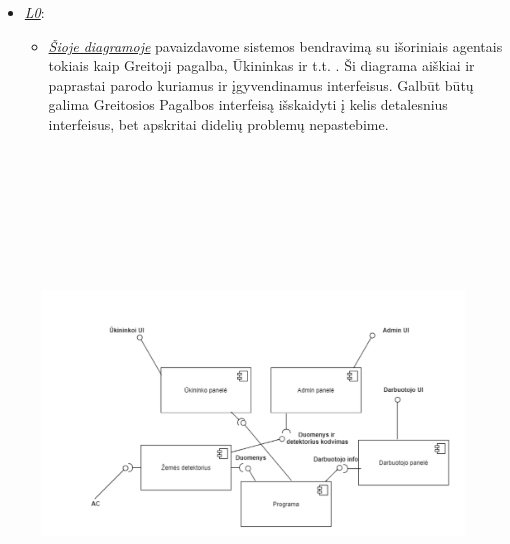 \documentclass[oneside]{VUMIFPSkursinis}
\begin{document}
	\begin{itemize}
		
		\item \hyperref[fig:l0]{\textit{L0}}:
		\begin{itemize}
			\item  \hyperref[fig:l0]{\textit{Šioje diagramoje}} pavaizdavome sistemos bendravimą su išoriniais agentais tokiais kaip Greitoji pagalba, Ūkininkas ir t.t. . Ši diagrama aiškiai ir paprastai parodo kuriamus ir įgyvendinamus interfeisus. Galbūt būtų galima Greitosios Pagalbos interfeisą išskaidyti į kelis detalesnius interfeisus, bet apskritai didelių problemų nepastebime.

		\end{itemize}

	\end{itemize}
\begin{figure}[H]	
\centering	
\includegraphics[width=14cm,height=14cm,keepaspectratio]{l1.png}	
\caption{}
\label{fig:l1}
\end{figure}
\end{document}
